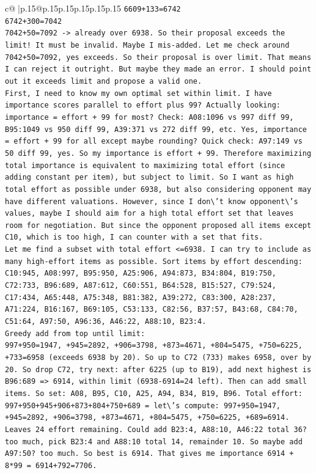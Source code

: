 \documentclass{article}
\begin{document}
{\begin{supertabular}{c@{$\;$}|p{.15\linewidth}@{}p{.15\linewidth}p{.15\linewidth}p{.15\linewidth}p{.15\linewidth}p{.15\linewidth}}
{{{\texttt{6609+133=6742} \\
\texttt{6742+300=7042} \\
\texttt{7042+50=7092 {-}> already over 6938. So their proposal exceeds the limit! It must be invalid. Maybe I mis{-}added. Let me check around 7042+50=7092, yes exceeds. So their proposal is over limit. That means I can reject it outright. But maybe they made an error. I should point out it exceeds limit and propose a valid one. } \\
\texttt{First, I need to know my own optimal set within limit. I have importance scores parallel to effort plus 99? Actually looking: importance = effort + 99 for most? Check: A08:1096 vs 997 diff 99, B95:1049 vs 950 diff 99, A39:371 vs 272 diff 99, etc. Yes, importance = effort + 99 for all except maybe rounding? Quick check: A97:149 vs 50 diff 99, yes. So my importance is effort + 99. Therefore maximizing total importance is equivalent to maximizing total effort (since adding constant per item), but subject to limit. So I want as high total effort as possible under 6938, but also considering opponent may have different valuations. However, since I don\textbackslash{}'t know opponent\textbackslash{}'s values, maybe I should aim for a high total effort set that leaves room for negotiation. But since the opponent proposed all items except C10, which is too high, I can counter with a set that fits. } \\
\texttt{Let me find a subset with total effort <=6938. I can try to include as many high{-}effort items as possible. Sort items by effort descending: C10:945, A08:997, B95:950, A25:906, A94:873, B34:804, B19:750, C72:733, B96:689, A87:612, C60:551, B64:528, B15:527, C79:524, C17:434, A65:448, A75:348, B81:382, A39:272, C83:300, A28:237, A71:224, B16:167, B69:105, C53:133, C82:56, B37:57, B43:68, C84:70, C51:64, A97:50, A96:36, A46:22, A88:10, B23:4. } \\
\texttt{Greedy add from top until limit: } \\
\texttt{997+950=1947, +945=2892, +906=3798, +873=4671, +804=5475, +750=6225, +733=6958 (exceeds 6938 by 20). So up to C72 (733) makes 6958, over by 20. So drop C72, try next: after 6225 (up to B19), add next highest is B96:689 => 6914, within limit (6938{-}6914=24 left). Then can add small items. So set: A08, B95, C10, A25, A94, B34, B19, B96. Total effort: 997+950+945+906+873+804+750+689 = let\textbackslash{}'s compute: 997+950=1947, +945=2892, +906=3798, +873=4671, +804=5475, +750=6225, +689=6914. Leaves 24 effort remaining. Could add B23:4, A88:10, A46:22 total 36? too much, pick B23:4 and A88:10 total 14, remainder 10. So maybe add A97:50? too much. So best is 6914. That gives me importance 6914 + 8*99 = 6914+792=7706. } \\
}}}
\end{supertabular}}
\end{document}
